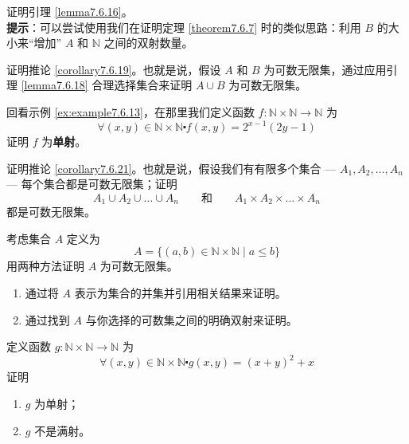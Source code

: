 \begin{exercise}
    证明引理 \ref{lemma7.6.16}。\label{exc:exercises7.8.19}\\
    \textbf{提示}：可以尝试使用我们在证明定理 \ref{theorem7.6.7} 时的类似思路：利用 $B$ 的大小来``增加'' $A$ 和 $\mathbb{N}$ 之间的双射数量。
\end{exercise}

\begin{exercise}
    证明推论 \ref{corollary7.6.19}。也就是说，假设 $A$ 和 $B$ 为可数无限集，通过应用引理 \ref{lemma7.6.18} 合理选择集合来证明 $A \cup B$ 为可数无限集。 \label{exc:exercises7.8.20}
\end{exercise}

\begin{exercise}
    回看示例 \ref{ex:example7.6.13}，在那里我们定义函数 $f : \mathbb{N} \times \mathbb{N} \to \mathbb{N}$ 为
    \[\forall (x, y) \in \mathbb{N} \times \mathbb{N} \centerdot f(x, y) = 2^{x-1}(2y - 1)\]
    证明 $f$ 为\textbf{单射}。\label{exc:exercises7.8.21}
\end{exercise}

\begin{exercise}
    证明推论 \ref{corollary7.6.21}。也就是说，假设我们有有限多个集合 --- $A_1, A_2,\dots,A_n$ --- 每个集合都是可数无限集；证明
    \[A_1 \cup A_2 \cup \dots \cup A_n \qquad \text{和} \qquad A_1 \times A_2 \times \dots \times A_n\]
    都是可数无限集。\label{exc:exercises7.8.22}
\end{exercise}

\begin{exercise}
    考虑集合 $A$ 定义为
    \[A = \{(a, b) \in \mathbb{N} \times \mathbb{N} \mid a \le b\}\]
    用两种方法证明 $A$ 为可数无限集。
    \begin{enumerate}[label=(\arabic*)]
        \item 通过将 $A$ 表示为集合的并集并引用相关结果来证明。
        \item 通过找到 $A$ 与你选择的可数集之间的明确双射来证明。
    \end{enumerate}
\end{exercise}

\begin{exercise}
    定义函数 $g : \mathbb{N} \times \mathbb{N} \to \mathbb{N}$ 为
    \[\forall (x, y) \in \mathbb{N} \times \mathbb{N} \centerdot g(x, y) = (x + y)^2 + x\]
    证明
    \begin{enumerate}[label=(\alph*)]
        \item $g$ 为单射；
        \item $g$ 不是满射。
    \end{enumerate}
\end{exercise}

